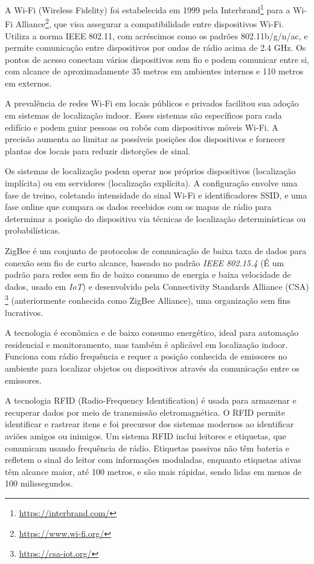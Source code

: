 \label{subsubsubsec:wifi}
A Wi-Fi (Wireless Fidelity) foi estabelecida em 1999 pela Interbrand\footnote{\url{https://interbrand.com/}} para a Wi-Fi Alliance\footnote{\url{https://www.wi-fi.org/}}, que visa assegurar a compatibilidade entre dispositivos Wi-Fi. Utiliza a norma IEEE 802.11, com acréscimos como os padrões 802.11b/g/n/ac, e permite comunicação entre dispositivos por ondas de rádio acima de 2.4 GHz. Os pontos de acesso conectam vários dispositivos sem fio e podem comunicar entre si, com alcance de aproximadamente 35 metros em ambientes internos e 110 metros em externos.

A prevalência de redes Wi-Fi em locais públicos e privados facilitou sua adoção em sistemas de localização indoor.
Esses sistemas são específicos para cada edifício e podem guiar pessoas ou robôs com dispositivos móveis Wi-Fi. A precisão aumenta ao limitar as possíveis posições dos dispositivos e fornecer plantas dos locais para reduzir distorções de sinal.

Os sistemas de localização podem operar nos próprios dispositivos (localização implícita) ou em servidores (localização explícita).
A configuração envolve uma fase de treino, coletando intensidade do sinal Wi-Fi e identificadores SSID, e uma fase online que compara os dados recebidos com os mapas de rádio para determinar a posição do dispositivo via técnicas de localização determinísticas ou probabilísticas.

\label{subsubsubsec:zigbee}
ZigBee é um conjunto de protocolos de comunicação de baixa taxa de dados para conexão sem fio de curto alcance, baseado no padrão \textit{IEEE 802.15.4} (É um padrão para redes sem fio de baixo consumo de energia e baixa velocidade de dados, usado em \textit{IoT}) e desenvolvido pela Connectivity Standards Alliance (CSA) \footnote{\url{https://csa-iot.org/}} (anteriormente conhecida como ZigBee Alliance), uma organização sem fins lucrativos.

A tecnologia é econômica e de baixo consumo energético, ideal para automação residencial e monitoramento, mas também é aplicável em localização indoor.
Funciona com rádio frequência e requer a posição conhecida de emissores no ambiente para localizar objetos ou dispositivos através da comunicação entre os emissores.

\label{subsubsubsec:rfid}
A tecnologia RFID (Radio-Frequency Identification) é usada para armazenar e recuperar dados por meio de transmissão eletromagnética.
O RFID permite identificar e rastrear itens e foi precursor dos sistemas modernos ao identificar aviões amigos ou inimigos.
Um sistema RFID inclui leitores e etiquetas, que comunicam usando frequência de rádio.
Etiquetas passivas não têm bateria e refletem o sinal do leitor com informações moduladas, enquanto etiquetas ativas têm alcance maior, até 100 metros, e são mais rápidas, sendo lidas em menos de 100 milissegundos.

